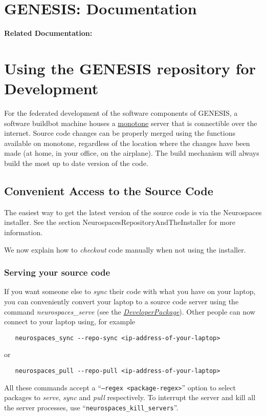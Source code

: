 \documentclass[12pt]{article}
\begin{document}
\section*{GENESIS: Documentation}

{\bf Related Documentation:}

\section*{Using the GENESIS repository for Development}

For the federated development of the software components of GENESIS, a software buildbot machine houses a \href{http://monotone.ca/}{monotone} server that is connectible over the internet. Source code changes can be properly merged using the functions available on monotone, regardless of the location where the changes have been made (at home, in your office, on the airplane). The build mechanism will always build the most up to date version of the code.

\subsection*{Convenient Access to the Source Code}

The easiest way to get the latest version of the source code is via the Neurospaces installer. See the section  NeurospacesRepositoryAndTheInstaller for more information.

We now explain how to {\it checkout} code manually when not using the installer.

\subsubsection*{Serving your source code}

If you want someone else to {\it sync} their code with what you have on your laptop, you can conveniently convert your laptop to a source code server using the command {\it neurospaces\_serve} (see the \href{../developer-package/developer-package.tex}{\it DeveloperPackage}). Other people can now connect to your laptop using, for example
\begin{verbatim}
   neurospaces_sync --repo-sync <ip-address-of-your-laptop>
\end{verbatim}
or
\begin {verbatim}
   neurospaces_pull --repo-pull <ip-address-of-your-laptop>
\end{verbatim}
All these commands accept a ``{\tt --regex <package-regex>}'' option to select packages to {\it serve}, {\it sync} and {\it pull} respectively. To interrupt the server and kill all the server processes, use ``{\tt neurospaces\_kill\_servers}''.
\end{document}
